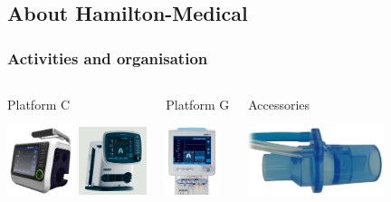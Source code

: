 \documentclass{beamer}
\begin{document}
\subsection[About Hamilton-Medical]{About Hamilton-Medical}
\begin{frame}
\frametitle{Activities and organisation}
\begin{columns} 
    \begin{block}{Platform C}
      \begin{center}
	\includegraphics[height=2cm]{../img/C1.png}
	\includegraphics[height=2cm]{../img/C2.png}
      \end{center}
    \end{block}

    \begin{block}{Platform G}
      \begin{center}
	\includegraphics[height=2cm]{../img/G5.png}
      \end{center}
    \end{block}

    \begin{block}{Accessories}
      \begin{center}
	\includegraphics[height=2cm]{../img/flowsensor.png}
      \end{center}
    \end{block}
\end{columns}

\end{frame}
\end{document}

